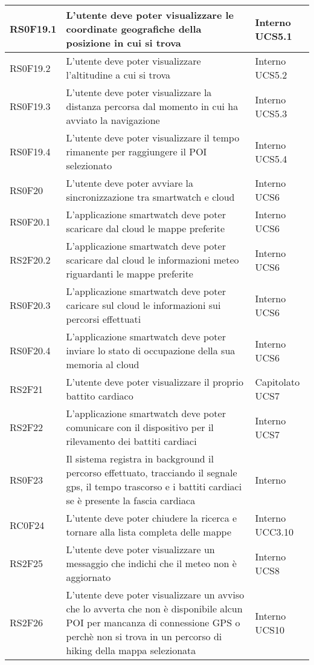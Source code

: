 \begin{center}
\begin{longtable}{|l|p{7cm}|p{1.7cm}|}
RS0F19.1	& L'utente deve poter visualizzare le coordinate geografiche della posizione in cui si trova & Interno UCS5.1 \\\hline
RS0F19.2	& L'utente deve poter visualizzare l'altitudine a cui si trova & Interno UCS5.2 \\\hline
RS0F19.3	& L'utente deve poter visualizzare la distanza percorsa dal momento in cui ha avviato la navigazione & Interno UCS5.3 \\\hline
RS0F19.4	& L'utente deve poter visualizzare il tempo rimanente per raggiungere il POI selezionato & Interno UCS5.4 \\\hline
RS0F20		& L'utente deve poter avviare la sincronizzazione tra smartwatch e cloud & Interno UCS6 \\\hline
RS0F20.1	& L'applicazione smartwatch deve poter scaricare dal cloud le mappe preferite & Interno UCS6 \\\hline
RS2F20.2	& L'applicazione smartwatch deve poter scaricare dal cloud le informazioni meteo riguardanti le mappe preferite & Interno UCS6 \\\hline
RS0F20.3	& L'applicazione smartwatch deve poter caricare sul cloud le informazioni sui percorsi effettuati & Interno UCS6 \\\hline
RS0F20.4		& L'applicazione smartwatch deve poter inviare lo stato di occupazione della sua memoria al cloud & Interno UCS6 \\\hline
RS2F21		& L'utente deve poter visualizzare il proprio battito cardiaco & Capitolato UCS7 \\\hline
RS2F22		& L'applicazione smartwatch deve poter comunicare con il dispositivo per il rilevamento dei battiti cardiaci & Interno UCS7 \\\hline
RS0F23		& Il sistema registra in background il percorso effettuato, tracciando il segnale gps, il tempo trascorso e i battiti cardiaci se è presente la fascia cardiaca & Interno \\\hline
RC0F24		& L'utente deve poter chiudere la ricerca e tornare alla lista completa delle mappe & Interno UCC3.10 \\\hline
RS2F25	& L'utente deve poter visualizzare un messaggio che indichi che il meteo non è aggiornato & Interno UCS8 \\\hline
RS2F26	& L'utente deve poter visualizzare un avviso che lo avverta che non è disponibile alcun POI per mancanza di connessione GPS o perchè non si trova in un percorso di hiking della mappa selezionata  & Interno UCS10 \\\hline

\end{longtable}
\end{center}
